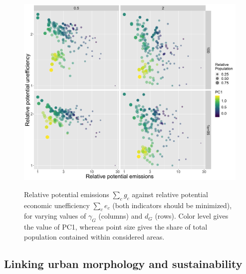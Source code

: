 \documentclass{jimis-en}
\begin{document}
\begin{figure}[!ht] 
  {\includegraphics[width=\linewidth]{figures/aggreg_morpho_relemissions-relefficiency_colpc1_logscale_targeted.png}}
  \centering  
  \caption{Relative potential emissions $\sum_c g_c$ against relative potential economic unefficiency $\sum_c e_c$ (both indicators should be minimized), for varying values of $\gamma_G$ (columns) and $d_G$ (rows). Color level gives the value of PC1, whereas point size gives the share of total population contained within considered areas.\label{fig:paretos-relative}}
\end{figure}


\subsection{Linking urban morphology and sustainability}



\end{document}
